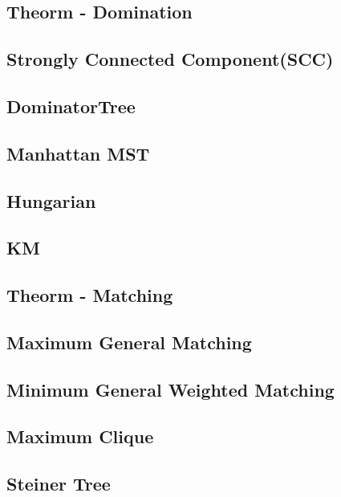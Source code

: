 \subsection{Theorm - Domination}

\subsection{Strongly Connected Component(SCC)}
\subsection{DominatorTree}


\subsection{Manhattan MST}

\subsection{Hungarian}

\subsection{KM}

\subsection{Theorm - Matching}

\subsection{Maximum General Matching}

\subsection{Minimum General Weighted Matching}

\subsection{Maximum Clique}

\subsection{Steiner Tree}


